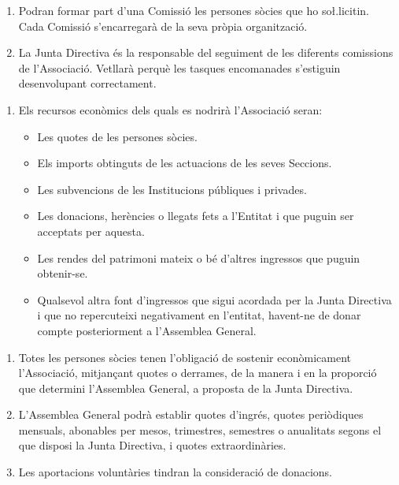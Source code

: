 \documentclass[11pt,a4paper]{article}
\newcommand{\JD}{Junta Directiva\xspace}
\newcommand{\AG}{Assemblea General\xspace}
\begin{document}
\begin{enumerate}
    \item Podran formar part d'una Comissió les persones sòcies que ho so\l.licitin. Cada Comissió s'encarregarà de la seva pròpia organització.

    \item La \JD és la responsable del seguiment de les diferents comissions de l'Associació. Vetllarà perquè les tasques encomanades s'estiguin desenvolupant correctament.
\end{enumerate}




\begin{enumerate}
    \item[] Els recursos econòmics dels quals es nodrirà l'Associació seran:
    \begin{itemize}
        \item Les quotes de les persones sòcies.
        \item Els imports obtinguts de les actuacions de les seves Seccions.
        \item Les subvencions de les Institucions públiques i privades.
        \item Les donacions, herències o llegats fets a l'Entitat i que puguin ser acceptats per aquesta.
        \item Les rendes del patrimoni mateix o bé d'altres ingressos que puguin obtenir-se.
        \item Qualsevol altra font d'ingressos que sigui acordada per la \JD i que no repercuteixi negativament en l'entitat, havent-ne de donar compte posteriorment a l'\AG.
    \end{itemize}
\end{enumerate}


\begin{enumerate}
    \item Totes les persones sòcies tenen l'obligació de sostenir econòmicament l'Associació, mitjançant quotes o derrames, de la manera i en la proporció que determini l'\AG, a proposta de la \JD.

    \item L'\AG podrà establir quotes d'ingrés, quotes periòdiques mensuals, abonables per mesos, trimestres, semestres o anualitats segons el que disposi la \JD, i quotes extraordinàries.

    \item Les aportacions voluntàries tindran la consideració de donacions.
\end{enumerate}
\end{document}
